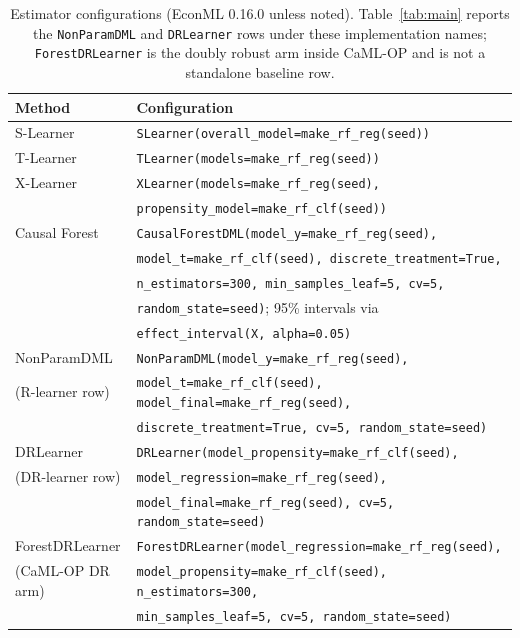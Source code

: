 \begin{table}[H]
\centering\small
\caption{Estimator configurations (EconML 0.16.0 unless noted). Table~\ref{tab:main} reports the \texttt{NonParamDML} and \texttt{DRLearner} rows under these implementation names; \texttt{ForestDRLearner} is the doubly robust arm inside CaML-OP and is not a standalone baseline row.}
\begin{tabular}{@{}ll@{}}
\toprule
Method & Configuration \\
\midrule
S-Learner & \texttt{SLearner(overall\_model=make\_rf\_reg(seed))} \\
T-Learner & \texttt{TLearner(models=make\_rf\_reg(seed))} \\
X-Learner & \texttt{XLearner(models=make\_rf\_reg(seed),} \\
          & \quad \texttt{propensity\_model=make\_rf\_clf(seed))} \\
Causal Forest & \texttt{CausalForestDML(model\_y=make\_rf\_reg(seed),} \\
              & \quad \texttt{model\_t=make\_rf\_clf(seed), discrete\_treatment=True,} \\
              & \quad \texttt{n\_estimators=300, min\_samples\_leaf=5, cv=5,} \\
              & \quad \texttt{random\_state=seed)}; 95\% intervals via \\
              & \quad \texttt{effect\_interval(X, alpha=0.05)} \\
NonParamDML & \texttt{NonParamDML(model\_y=make\_rf\_reg(seed),} \\
(R-learner row) & \quad \texttt{model\_t=make\_rf\_clf(seed), model\_final=make\_rf\_reg(seed),} \\
          & \quad \texttt{discrete\_treatment=True, cv=5, random\_state=seed)} \\
DRLearner & \texttt{DRLearner(model\_propensity=make\_rf\_clf(seed),} \\
(DR-learner row) & \quad \texttt{model\_regression=make\_rf\_reg(seed),} \\
           & \quad \texttt{model\_final=make\_rf\_reg(seed), cv=5, random\_state=seed)} \\
ForestDRLearner & \texttt{ForestDRLearner(model\_regression=make\_rf\_reg(seed),} \\
(CaML-OP DR arm) & \quad \texttt{model\_propensity=make\_rf\_clf(seed), n\_estimators=300,} \\
                 & \quad \texttt{min\_samples\_leaf=5, cv=5, random\_state=seed)} \\
\bottomrule
\end{tabular}
\end{table}

